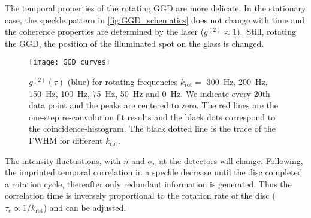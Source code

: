 The temporal properties of the rotating \Ac{GGD} are more delicate. In the stationary case, the speckle pattern in \cref{fig:GGD_schematics} does not change with time and the coherence properties are determined by the laser ($g^{(2)}\approx 1$).\
Still, rotating the \ac{GGD}, the position of the illuminated spot on the glass is changed. 
	\begin{figure}[t!]
		\centering
		\texttt{[image: GGD\_curves]}
		\caption{$g^{(2)}(\tau)$ (blue) for rotating frequencies $k_\mathrm{rot}=$ \SI{300}{\Hz}, \SI{200}{\Hz}, \SI{150}{\Hz}, \SI{100}{\Hz}, \SI{75}{\Hz}, \SI{50}{\Hz} and \SI{0}{\Hz}. We indicate every 20th data point and the peaks are centered to zero. The red lines are the one-step re-convolution fit results and the black dots correspond to the coincidence-histogram. The black dotted line is the trace of the \ac{FWHM} for different $k_\mathrm{rot}$.}
		\label{fig:GGD_curves}
	\end{figure}
\noindent The intensity fluctuations, with $\bar{n}$ and $ \sigma_n$ at the detectors will change. Following, the imprinted temporal correlation in a speckle decrease until the disc completed a rotation cycle, thereafter only redundant information is generated. Thus the correlation time is inversely proportional to the rotation rate of the disc ($\tau_c \propto 1/k_\mathrm{rot}$) and can be adjusted.\\

